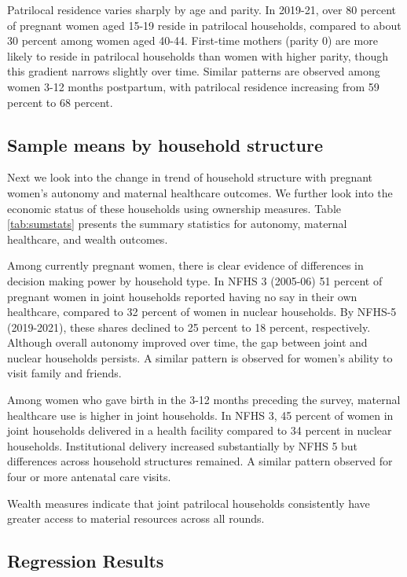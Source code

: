 \documentclass[12pt]{article}
\begin{document}
Patrilocal residence varies sharply by age and parity. In 2019-21, over 80 percent of pregnant women aged 15-19 reside in patrilocal households, compared to about 30 percent among women aged 40-44. First-time mothers (parity 0) are more likely to reside in patrilocal households than women with higher parity, though this gradient narrows slightly over time. Similar patterns are observed among women 3-12 months postpartum, with patrilocal residence increasing from 59 percent to 68 percent.

\subsection{Sample means by household structure}
Next we look into the change in trend of household structure with pregnant women’s autonomy and maternal healthcare outcomes. We further look into the economic status of these households using ownership measures. Table \ref{tab:sumstats} presents the summary statistics for autonomy, maternal healthcare, and wealth outcomes. 

Among currently pregnant women, there is clear evidence of differences in decision making power by household type. In NFHS 3 (2005-06) 51 percent of pregnant  women in joint households reported having no say in their own healthcare, compared to 32 percent of women in nuclear households. By NFHS-5 (2019-2021), these shares declined to  25 percent to 18 percent, respectively. Although overall autonomy improved over time, the gap between joint and nuclear households persists. A similar pattern is observed for women’s ability to visit family and friends. 

Among women who gave birth in the 3-12 months preceding the survey, maternal healthcare use is higher in joint households. In NFHS 3, 45 percent of women in joint households delivered in a health facility compared to 34 percent in nuclear households. Institutional delivery increased substantially by NFHS 5 but differences across household structures remained. A similar pattern observed for four or more antenatal care visits. 

Wealth measures indicate that joint patrilocal households consistently have greater access to material resources across all rounds. 





\subsection{Regression Results}
\end{document}
